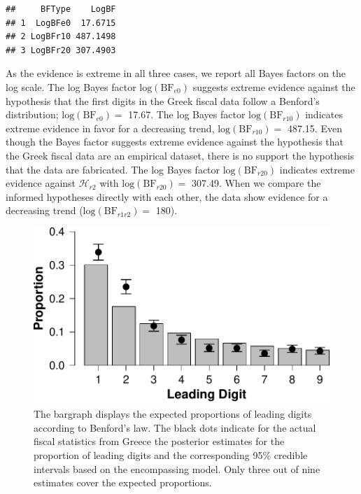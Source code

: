 \documentclass[
  english,
  man,floatsintext]{apa6}
\begin{document}
\begin{verbatim}
##     BFType    LogBF
## 1  LogBFe0  17.6715
## 2 LogBFr10 487.1498
## 3 LogBFr20 307.4903
\end{verbatim}

As the evidence is extreme in all three cases, we report all Bayes factors on the log scale. The log Bayes factor \(\text{log}(\text{BF}_{e0})\) suggests extreme evidence against the hypothesis that the first digits in the Greek fiscal data follow a Benford's distribution; \(\text{log}(\text{BF}_{e0}) =\) 17.67. The log Bayes factor \(\text{log}(\text{BF}_{r10})\) indicates extreme evidence in favor for a decreasing trend, \(\text{log}(\text{BF}_{r10}) =\) 487.15. Even though the Bayes factor suggests extreme evidence against the hypothesis that the Greek fiscal data are an empirical dataset, there is no support the hypothesis that the data are fabricated. The log Bayes factor \(\text{log}(\text{BF}_{r20})\) indicates extreme evidence against \(\mathcal{H}_{r2}\) with \(\text{log}(\text{BF}_{r20}) =\) 307.49. When we compare the informed hypotheses directly with each other, the data show evidence for a decreasing trend (\(\text{log}(\text{BF}_{r1r2}) =\) 180).



\begin{figure}
\centering
\includegraphics{Rpackage_paper_files/figure-latex/benford-1.pdf}
\caption{\label{fig:benford}The bargraph displays the expected proportions of leading digits according to Benford's law. The black dots indicate for the actual fiscal statistics from Greece the posterior estimates for the proportion of leading digits and the corresponding 95\% credible intervals based on the encompassing model. Only three out of nine estimates cover the expected proportions.}
\end{figure}
\end{document}
